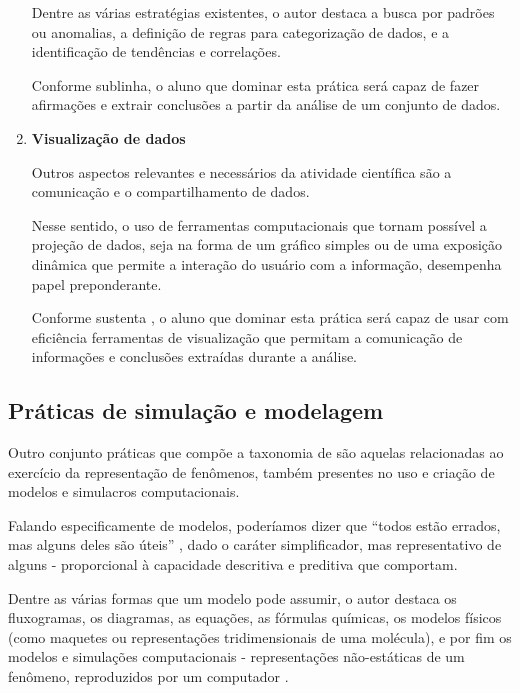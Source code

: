 \begin{enumerate}
  Dentre as várias estratégias existentes, o autor destaca a busca por padrões ou anomalias, a definição de regras para categorização de dados, e a identificação de tendências e correlações. 

  Conforme sublinha, o aluno que dominar esta prática será capaz de fazer afirmações e extrair conclusões a partir da análise de um conjunto de dados.


  \item \textbf{Visualização de dados}

  Outros aspectos relevantes e necessários da atividade científica são a comunicação e o compartilhamento de dados.

  Nesse sentido, o uso de ferramentas computacionais que tornam possível a projeção de dados, seja na forma de um gráfico simples ou de uma exposição dinâmica que permite a interação do usuário com a informação, desempenha papel preponderante.

  Conforme sustenta , o aluno que dominar esta prática será capaz de usar com eficiência ferramentas de visualização que permitam a comunicação de informações e conclusões extraídas durante a análise.

\end{enumerate}

\subsection{Práticas de simulação e modelagem}\label{sub-sec:praticas-de-simulacao-e-modelagem}

Outro conjunto práticas que compõe a taxonomia de  são aquelas relacionadas ao exercício da representação de fenômenos, também presentes no uso e criação de modelos e simulacros computacionais. 

Falando especificamente de modelos, poderíamos dizer que ``todos estão errados, mas alguns deles são úteis'' , dado o caráter simplificador, mas representativo de alguns - proporcional à capacidade descritiva e preditiva que comportam. 

Dentre as várias formas que um modelo pode assumir, o autor destaca os fluxogramas, os diagramas, as equações, as fórmulas químicas, os modelos físicos (como maquetes ou representações tridimensionais de uma molécula), e por fim os modelos e simulações computacionais - representações não-estáticas de um fenômeno, reproduzidos por um computador \cite{Weintrop2016}.

